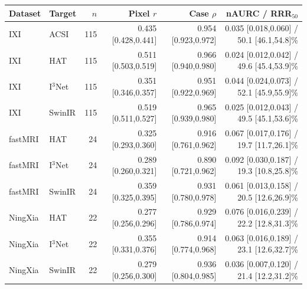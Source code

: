 \begin{tabular}{llrrrr}
\toprule
Dataset & Target & $n$ & Pixel $r$ & Case $\rho$ & nAURC / RRR$_{50}$ \\
\midrule
IXI & ACSI & 115 & 0.435 [0.428,0.441] & 0.954 [0.923,0.972] & 0.035 [0.018,0.060] / 50.1 [46.1,54.8]\% \\
IXI & HAT & 115 & 0.511 [0.503,0.519] & 0.966 [0.940,0.980] & 0.024 [0.012,0.042] / 49.6 [45.4,53.9]\% \\
IXI & I$^3$Net & 115 & 0.351 [0.346,0.357] & 0.951 [0.922,0.969] & 0.044 [0.024,0.073] / 52.1 [45.9,55.9]\% \\
IXI & SwinIR & 115 & 0.519 [0.511,0.527] & 0.965 [0.939,0.980] & 0.025 [0.012,0.043] / 49.5 [45.1,53.6]\% \\
fastMRI & HAT & 24 & 0.325 [0.293,0.360] & 0.916 [0.761,0.962] & 0.067 [0.017,0.176] / 19.7 [11.7,26.1]\% \\
fastMRI & I$^3$Net & 24 & 0.289 [0.260,0.321] & 0.890 [0.721,0.962] & 0.092 [0.030,0.187] / 19.3 [10.8,25.8]\% \\
fastMRI & SwinIR & 24 & 0.359 [0.325,0.395] & 0.931 [0.780,0.978] & 0.061 [0.013,0.158] / 20.5 [12.6,26.9]\% \\
NingXia & HAT & 22 & 0.277 [0.256,0.296] & 0.929 [0.786,0.974] & 0.076 [0.016,0.239] / 22.2 [12.8,31.3]\% \\
NingXia & I$^3$Net & 22 & 0.355 [0.331,0.376] & 0.914 [0.774,0.968] & 0.063 [0.016,0.189] / 23.1 [12.6,32.7]\% \\
NingXia & SwinIR & 22 & 0.279 [0.256,0.300] & 0.936 [0.804,0.985] & 0.036 [0.007,0.120] / 21.4 [12.2,31.2]\% \\
\bottomrule
\end{tabular}
